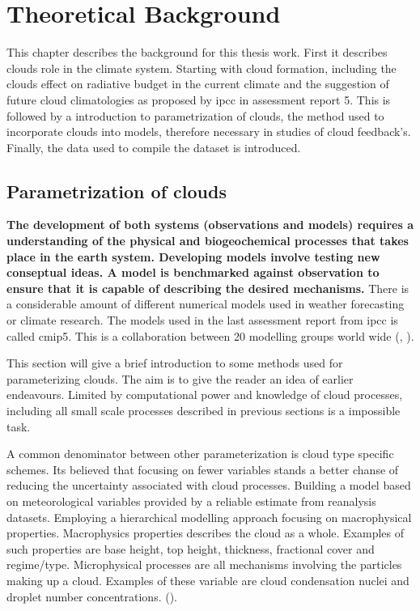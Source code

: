 \setcounter{chapter}{1} 
\chapter{Theoretical Background } \label{ch:theoretical_back}
This chapter describes the background for this thesis work. First it describes clouds role in the climate system. Starting with cloud formation, including the clouds effect on radiative budget in the current climate and the suggestion of future cloud climatologies as proposed by \acrfull{ipcc} in assessment report 5. This is followed by a introduction to parametrization of clouds, the method used to incorporate clouds into models, therefore necessary in studies of cloud feedback's. %
Finally, the data used to compile the dataset is introduced. 



\section{Parametrization of clouds} \label{sec:param_clouds}
\textbf{The development of both systems (observations and models) requires a understanding of the physical and biogeochemical processes that takes place in the earth system.
Developing models involve testing new conseptual ideas. A model is benchmarked against observation to ensure that it is capable of describing the desired mechanisms.} There is a considerable amount of different numerical models used in weather forecasting or climate research. The models used in the last assessment report from \acrshort{ipcc} is called \acrfull{cmip5}. This is a collaboration between 20 modelling groups world wide (\cite{Taylor2012AnDesign}, \cite{IPCC_CH9_climate_models}). 

This section will give a brief introduction to some methods used for parameterizing clouds. The aim is to give the reader an idea of earlier endeavours. Limited by computational power and knowledge of cloud processes, including all small scale processes described in previous sections is a impossible task. 

A common denominator between other parameterization is cloud type specific schemes. Its believed that focusing on fewer variables stands a better chanse of reducing the uncertainty associated with cloud processes. Building a model based on meteorological variables provided by a reliable estimate from reanalysis datasets. Employing a hierarchical modelling approach focusing on macrophysical properties. Macrophysics properties describes the cloud as a whole. Examples of such properties are base height, top height, thickness, fractional cover and regime/type. Microphysical processes are all mechanisms involving the particles making up a cloud. Examples of these variable are cloud condensation nuclei and droplet number concentrations. (\cite{Grabowski2019ModelingBetter}).


